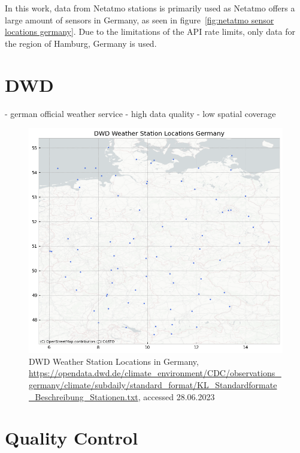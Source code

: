 In this work, data from Netatmo stations is primarily used as Netatmo offers a large amount of sensors in Germany, as seen in figure~\ref{fig:netatmo sensor locations germany}. Due to the limitations of the API rate limits, only data for the region of Hamburg, Germany is used.

\section{DWD}

- german official weather service
- high data quality
- low spatial coverage

\begin{figure}[ht]
    \centering
    \includegraphics[width=1\textwidth]{images/dwd_weather_station_locations_germany.png}
    \caption{DWD Weather Station Locations in Germany, \url{https://opendata.dwd.de/climate_environment/CDC/observations_germany/climate/subdaily/standard_format/KL_Standardformate_Beschreibung_Stationen.txt}, accessed 28.06.2023}
    \label{fig:dwd sensor locations germany}
\end{figure}

\section{Quality Control}

